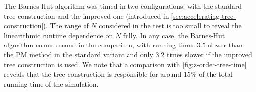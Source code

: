 The Barnes-Hut algorithm was timed in two configurations: with the standard tree construction and the improved one (introduced in \autoref{sec:accelerating-tree-construction}).
The range of $ N $ considered in the test is too small to reveal the linearithmic runtime dependence on $N$ fully.
In any case, the Barnes-Hut algorithm comes second in the comparison, with running times 3.5 slower than the PM method in the standard variant and only 3.2 times slower if the improved tree construction is used.
We note that a comparison with \autoref{fig:z-order-tree-time} reveals that the tree construction is responsible for around 15\% of the total running time of the simulation.